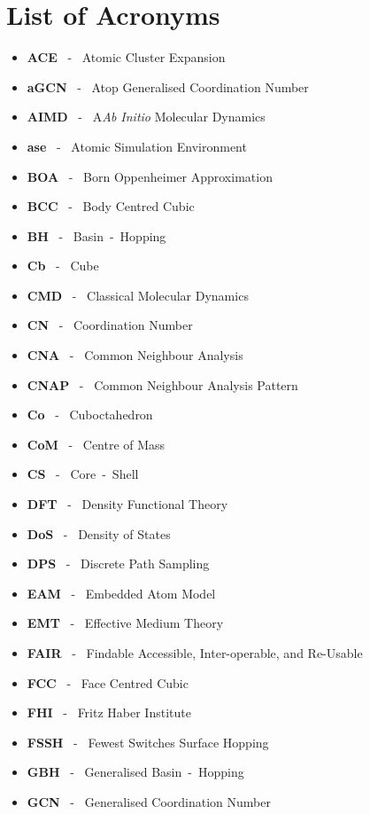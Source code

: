 \chapter*{List of Acronyms}

\begin{itemize}
\item[]\textbf{ACE} ~-~ Atomic Cluster Expansion
\item[]\textbf{aGCN} ~-~ Atop Generalised Coordination Number
\item[]\textbf{AIMD} ~-~ A\textit{Ab Initio} Molecular Dynamics
\item[]\textbf{ase} ~-~ Atomic Simulation Environment
\item[]\textbf{BOA} ~-~ Born Oppenheimer Approximation
\item[]\textbf{BCC} ~-~ Body Centred Cubic
\item[]\textbf{BH} ~-~ Basin~-~Hopping
\item[]\textbf{Cb} ~-~ Cube
\item[]\textbf{CMD} ~-~ Classical Molecular Dynamics
\item[]\textbf{CN} ~-~ Coordination Number
\item[]\textbf{CNA} ~-~ Common Neighbour Analysis
\item[]\textbf{CNAP} ~-~ Common Neighbour Analysis Pattern
\item[]\textbf{Co} ~-~ Cuboctahedron
\item[]\textbf{CoM} ~-~ Centre of Mass
\item[] \textbf{CS} ~-~ Core~-~Shell
\item[]\textbf{DFT} ~-~ Density Functional Theory
\item[]\textbf{DoS} ~-~ Density of States
\item[]\textbf{DPS} ~-~ Discrete Path Sampling
\item[]\textbf{EAM} ~-~ Embedded Atom Model
\item[]\textbf{EMT} ~-~ Effective Medium Theory
\item[]\textbf{FAIR} ~-~ Findable Accessible, Inter-operable, and Re-Usable
\item[]\textbf{FCC} ~-~ Face Centred Cubic
\item[]\textbf{FHI} ~-~ Fritz Haber Institute
\item[]\textbf{FSSH} ~-~ Fewest Switches Surface Hopping
\item[]\textbf{GBH} ~-~ Generalised Basin~-~Hopping
\item[]\textbf{GCN} ~-~ Generalised Coordination Number

\end{itemize}
